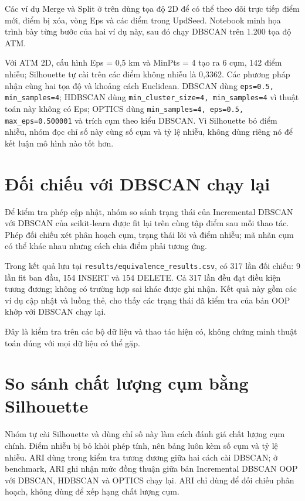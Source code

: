 Các ví dụ Merge và Split ở trên dùng tọa độ 2D để có thể theo dõi trực tiếp điểm mới, điểm bị xóa, vòng Eps và các điểm trong \(\mathrm{UpdSeed}\). Notebook minh họa trình bày từng bước của hai ví dụ này, sau đó chạy DBSCAN trên 1.200 tọa độ ATM.

Với ATM 2D, cấu hình Eps = 0,5 km và MinPts = 4 tạo ra 6 cụm, 142 điểm nhiễu; Silhouette tự cài trên các điểm không nhiễu là 0,3362. Các phương pháp nhận cùng hai tọa độ và khoảng cách Euclidean. DBSCAN dùng \texttt{eps=0.5, min\_samples=4}; HDBSCAN dùng \texttt{min\_cluster\_size=4, min\_samples=4} vì thuật toán này không có Eps; OPTICS dùng \texttt{min\_samples=4, eps=0.5, max\_eps=0.500001} và trích cụm theo kiểu DBSCAN. Vì Silhouette bỏ điểm nhiễu, nhóm đọc chỉ số này cùng số cụm và tỷ lệ nhiễu, không dùng riêng nó để kết luận mô hình nào tốt hơn.

\section{Đối chiếu với DBSCAN chạy lại}

Để kiểm tra phép cập nhật, nhóm so sánh trạng thái của Incremental DBSCAN với DBSCAN của scikit-learn được fit lại trên cùng tập điểm sau mỗi thao tác. Phép đối chiếu xét phân hoạch cụm, trạng thái lõi và điểm nhiễu; mã nhãn cụm có thể khác nhau nhưng cách chia điểm phải tương ứng.

Trong kết quả lưu tại \texttt{results/equivalence\_results.csv}, có 317 lần đối chiếu: 9 lần fit ban đầu, 154 INSERT và 154 DELETE. Cả 317 lần đều đạt điều kiện tương đương; không có trường hợp sai khác được ghi nhận. Kết quả này gồm các ví dụ cập nhật và luồng thẻ, cho thấy các trạng thái đã kiểm tra của bản OOP khớp với DBSCAN chạy lại.

Đây là kiểm tra trên các bộ dữ liệu và thao tác hiện có, không chứng minh thuật toán đúng với mọi dữ liệu có thể gặp.

\section{So sánh chất lượng cụm bằng Silhouette}

Nhóm tự cài Silhouette và dùng chỉ số này làm cách đánh giá chất lượng cụm chính. Điểm nhiễu bị bỏ khỏi phép tính, nên bảng luôn kèm số cụm và tỷ lệ nhiễu. ARI dùng trong kiểm tra tương đương giữa hai cách cài DBSCAN; ở benchmark, ARI ghi nhận mức đồng thuận giữa bản Incremental DBSCAN OOP với DBSCAN, HDBSCAN và OPTICS chạy lại. ARI chỉ dùng để đối chiếu phân hoạch, không dùng để xếp hạng chất lượng cụm.

